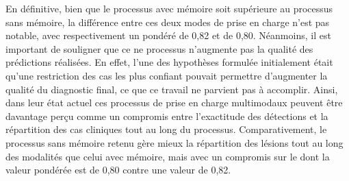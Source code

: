 En définitive, bien que le processus avec mémoire soit supérieure au processus sans mémoire, la différence entre ces deux modes de prise en charge n'est pas notable, avec respectivement un \fscore{} pondéré de 0,82 et de 0,80. Néanmoins, il est important de souligner que ce ne processus n'augmente pas la qualité des prédictions réalisées. En effet, l'une des hypothèses formulée initialement était qu'une restriction des cas les plus confiant pouvait permettre d'augmenter la qualité du diagnostic final, ce que ce travail ne parvient pas à accomplir. Ainsi, dans leur état actuel ces processus de prise en charge multimodaux peuvent être davantage perçu comme un compromis entre l'exactitude des détections et la répartition des cas cliniques tout au long du processus. Comparativement, le processus sans mémoire retenu gère mieux la répartition des lésions tout au long des modalités que celui avec mémoire, mais avec un compromis sur le \fscore{} dont la valeur pondérée est de 0,80 contre une valeur de 0,82.\par
